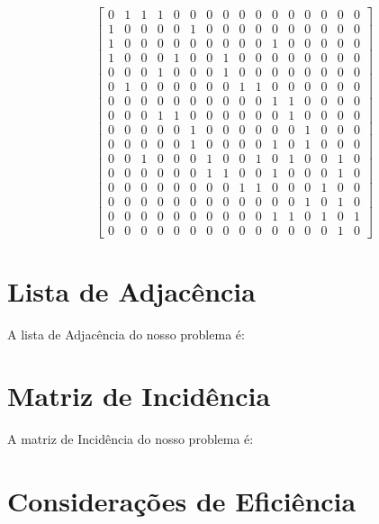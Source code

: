 \documentclass[
12pt,
a4paper,
semrecuonosumario,
sumario = abnt-6027-2012]{report}
\begin{document}
	\[
	\begin{bmatrix}
		0 & 1 & 1 & 1 & 0 & 0 & 0 & 0 & 0 & 0 & 0 & 0 & 0 & 0 & 0 & 0\\%
		1 & 0 & 0 & 0 & 0 & 1 & 0 & 0 & 0 & 0 & 0 & 0 & 0 & 0 & 0 & 0\\%
		1 & 0 & 0 & 0 & 0 & 0 & 0 & 0 & 0 & 0 & 1 & 0 & 0 & 0 & 0 & 0\\%
		1 & 0 & 0 & 0 & 1 & 0 & 0 & 1 & 0 & 0 & 0 & 0 & 0 & 0 & 0 & 0\\%
		0 & 0 & 0 & 1 & 0 & 0 & 0 & 1 & 0 & 0 & 0 & 0 & 0 & 0 & 0 & 0\\%
		0 & 1 & 0 & 0 & 0 & 0 & 0 & 0 & 1 & 1 & 0 & 0 & 0 & 0 & 0 & 0\\%
		0 & 0 & 0 & 0 & 0 & 0 & 0 & 0 & 0 & 0 & 1 & 1 & 0 & 0 & 0 & 0\\%
		0 & 0 & 0 & 1 & 1 & 0 & 0 & 0 & 0 & 0 & 0 & 1 & 0 & 0 & 0 & 0\\%
		0 & 0 & 0 & 0 & 0 & 1 & 0 & 0 & 0 & 0 & 0 & 0 & 1 & 0 & 0 & 0\\%
		0 & 0 & 0 & 0 & 0 & 1 & 0 & 0 & 0 & 0 & 1 & 0 & 1 & 0 & 0 & 0\\%
		0 & 0 & 1 & 0 & 0 & 0 & 1 & 0 & 0 & 1 & 0 & 1 & 0 & 0 & 1 & 0\\%
		0 & 0 & 0 & 0 & 0 & 0 & 1 & 1 & 0 & 0 & 1 & 0 & 0 & 0 & 1 & 0\\%
		0 & 0 & 0 & 0 & 0 & 0 & 0 & 0 & 1 & 1 & 0 & 0 & 0 & 1 & 0 & 0\\%
		0 & 0 & 0 & 0 & 0 & 0 & 0 & 0 & 0 & 0 & 0 & 0 & 1 & 0 & 1 & 0\\%
		0 & 0 & 0 & 0 & 0 & 0 & 0 & 0 & 0 & 0 & 1 & 1 & 0 & 1 & 0 & 1\\%
		0 & 0 & 0 & 0 & 0 & 0 & 0 & 0 & 0 & 0 & 0 & 0 & 0 & 0 & 1 & 0 %
	\end{bmatrix}
	\]

	
	\section{Lista de Adjacência}\label{sec:lista}
	
	A lista de Adjacência do nosso problema é:
	
	\section{Matriz de Incidência}\label{sec:incidencia}
	
	A matriz de Incidência do nosso problema é:
	
	\section{Considerações de Eficiência}\label{sec:eficienciaRepresentacao}
	
\end{document}
